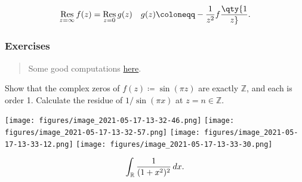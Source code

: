 \begin{proposition}

\begin{align*}
\mathop{\mathrm{Res}}_{z=\infty}f(z) = \mathop{\mathrm{Res}}_{z=0} g(z) && g(z) \coloneqq-{1 \over z^2}f\qty{1\over z} 
.\end{align*}

\end{proposition}

\hypertarget{exercises-3}{%
\subsubsection{Exercises}\label{exercises-3}}

\begin{quote}
Some good computations
\href{https://math.mit.edu/~jorloff/18.04/notes/topic9.pdf}{here}.
\end{quote}

\begin{exercise}

Show that the complex zeros of \(f(z) \coloneqq\sin(\pi z)\) are exactly
\({\mathbb{Z}}\), and each is order 1. Calculate the residue of
\(1/\sin(\pi x)\) at \(z=n\in {\mathbb{Z}}\).

\end{exercise}

\texttt{[image: figures/image\_2021-05-17-13-32-46.png]}
\texttt{[image: figures/image\_2021-05-17-13-32-57.png]}
\texttt{[image: figures/image\_2021-05-17-13-33-12.png]}
\texttt{[image: figures/image\_2021-05-17-13-33-30.png]}

\begin{exercise}[?]

\begin{align*}
\int_{\mathbb{R}}{1 \over (1+x^2)^2} \,dx
.\end{align*}

\end{exercise}

